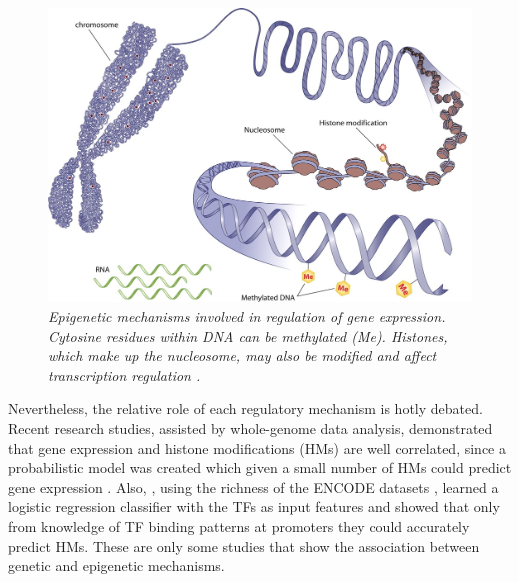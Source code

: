 \begin{figure}[!ht]
\begin{center}
 \includegraphics[scale = 0.27]{images/epigenetics3}
\caption{\emph{Epigenetic mechanisms involved in regulation of gene expression. Cytosine residues within DNA can be methylated (Me). Histones, which make up the nucleosome, may also be modified and affect transcription regulation \citep{Horsager2014}.}}
\label{epigenetics-pic}
\end{center}
\end{figure}


Nevertheless, the relative role of each regulatory mechanism is hotly debated. Recent research studies, assisted by whole-genome data analysis, demonstrated that gene expression and histone modifications (HMs) are well correlated, since a probabilistic model was created which given a small number of HMs could predict gene expression \citep{Karlic2010}. Also, \citet{Benveniste2014}, using the richness of the ENCODE datasets \citep{Dunham2012}, learned a logistic regression classifier with the TFs as input features and showed that only from knowledge of TF binding patterns at promoters they could accurately predict HMs. These are only some studies that show the association between genetic and epigenetic mechanisms. 